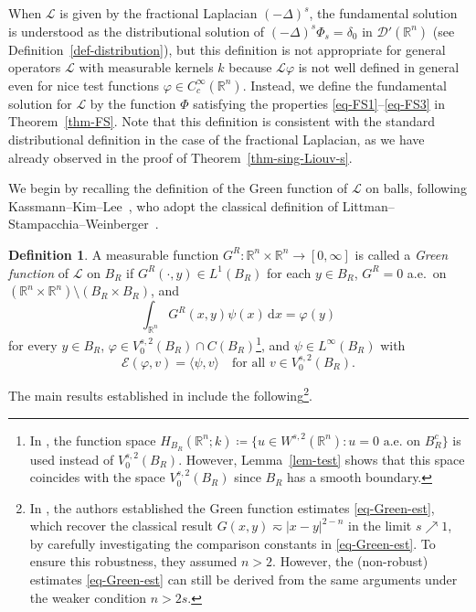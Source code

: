 \documentclass[11pt]{amsart}
\theoremstyle{plain}
\theoremstyle{definition}
\newtheorem{definition}[theorem]{Definition}
\numberwithin{equation}{section}
\begin{document}
When $\mathcal{L}$ is given by the fractional Laplacian $(-\Delta)^s$, the fundamental solution is understood as the distributional solution of $(-\Delta)^s \Phi_s = \delta_0$ in $\mathscr{D}'(\mathbb{R}^n)$ (see Definition~\ref{def-distribution}), but this definition is not appropriate for general operators $\mathcal{L}$ with measurable kernels $k$ because $\mathcal{L}\varphi$ is not well defined in general even for nice test functions $\varphi \in C^\infty_c(\mathbb{R}^n)$. Instead, we define the fundamental solution for $\mathcal{L}$ by the function $\Phi$ satisfying the properties \eqref{eq-FS1}--\eqref{eq-FS3} in Theorem~\ref{thm-FS}. Note that this definition is consistent with the standard distributional definition in the case of the fractional Laplacian, as we have already observed in the proof of Theorem~\ref{thm-sing-Liouv-s}.

We begin by recalling the definition of the Green function of $\mathcal{L}$ on balls, following Kassmann--Kim--Lee~\cite{KKL23}, who adopt the classical definition of Littman--Stampacchia--Weinberger~\cite{LSW63}.

\begin{definition}\cite[Definition~1.2]{KKL23}
A measurable function $G^R: \mathbb{R}^n \times \mathbb{R}^n \to [0, \infty]$ is called a \emph{Green function} of $\mathcal{L}$ on $B_R$ if $G^R(\cdot, y) \in L^1(B_R)$ for each $y \in B_R$, $G^R=0$ a.e.\ on $(\mathbb{R}^n \times \mathbb{R}^n) \setminus (B_R \times B_R)$, and
\begin{equation*}
    \int_{\mathbb{R}^n} G^R(x, y)\psi(x) \,\mathrm{d}x = \varphi(y)
\end{equation*}
for every $y \in B_R$, $\varphi \in V^{s, 2}_0(B_R) \cap C(B_R)$\footnote{In \cite{KKL23}, the function space $H_{B_R}(\mathbb{R}^n; k) \coloneqq \{u \in W^{s, 2}(\mathbb{R}^n): u=0\text{ a.e.\ on }B_R^c\}$ is used instead of $V^{s, 2}_0(B_R)$. However, Lemma~\ref{lem-test} shows that this space coincides with the space $V^{s, 2}_0(B_R)$ since $B_R$ has a smooth boundary.}, and $\psi \in L^\infty(B_R)$ with
\begin{equation*}
    \mathcal{E}(\varphi, v) = \langle \psi, v \rangle \quad\text{for all } v \in V^{s, 2}_0(B_R).
\end{equation*}
\end{definition}

The main results established in \cite{KKL23} include the following\footnote{In \cite{KKL23}, the authors established the Green function estimates \eqref{eq-Green-est}, which recover the classical result $G(x, y) \eqsim |x-y|^{2-n}$ in the limit $s \nearrow 1$, by carefully investigating the comparison constants in \eqref{eq-Green-est}. To ensure this robustness, they assumed $n>2$. However, the (non-robust) estimates \eqref{eq-Green-est} can still be derived from the same arguments under the weaker condition $n > 2s$.}.
\end{document}
